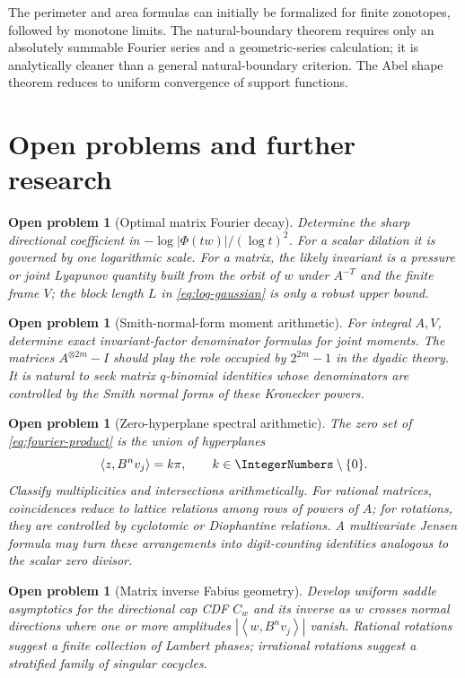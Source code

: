 \documentclass[11pt,oneside]{article}
\newtheorem{problem}[theorem]{Open problem}
\theoremstyle{definition}
\theoremstyle{remark}
\newcommand{\ip}[2]{\left\langle #1,#2\right\rangle}
\begin{document}
The perimeter and area formulas can initially be formalized for finite
zonotopes, followed by monotone limits.  The natural-boundary theorem requires
only an absolutely summable Fourier series and a geometric-series calculation;
it is analytically cleaner than a general natural-boundary criterion.  The Abel
shape theorem reduces to uniform convergence of support functions.

\section{Open problems and further research}
\label{sec:future}

\begin{problem}[Optimal matrix Fourier decay]
\label{prob:optimal-decay}
Determine the sharp directional coefficient in
$-\log|\Phi(tw)|/(\log t)^2$.  For a scalar dilation it is governed by one
logarithmic scale.  For a matrix, the likely invariant is a pressure or joint
Lyapunov quantity built from the orbit of $w$ under $A^{-T}$ and the finite
frame $V$; the block length $L$ in \eqref{eq:log-gaussian} is only a robust upper
bound.
\end{problem}

\begin{problem}[Smith-normal-form moment arithmetic]
For integral $A,V$, determine exact invariant-factor denominator formulas for
joint moments.  The matrices $A^{\otimes 2m}-I$ should play the role occupied by
$2^{2m}-1$ in the dyadic theory.  It is natural to seek matrix $q$-binomial
identities whose denominators are controlled by the Smith normal forms of these
Kronecker powers.
\end{problem}

\begin{problem}[Zero-hyperplane spectral arithmetic]
The zero set of \eqref{eq:fourier-product} is the union of hyperplanes
\[
 \ip{z}{B^nv_j}=k\pi,
 \qquad k\in\IntegerNumbers\setminus\{0\}.
\]
Classify multiplicities and intersections arithmetically.  For rational matrices,
coincidences reduce to lattice relations among rows of powers of $A$; for
rotations, they are controlled by cyclotomic or Diophantine relations.  A
multivariate Jensen formula may turn these arrangements into digit-counting
identities analogous to the scalar zero divisor.
\end{problem}

\begin{problem}[Matrix inverse Fabius geometry]
Develop uniform saddle asymptotics for the directional cap CDF $C_w$ and its
inverse as $w$ crosses normal directions where one or more amplitudes
$|\ip{w}{B^nv_j}|$ vanish.  Rational rotations suggest a finite collection of
Lambert phases; irrational rotations suggest a stratified family of singular
cocycles.
\end{problem}
\end{document}
